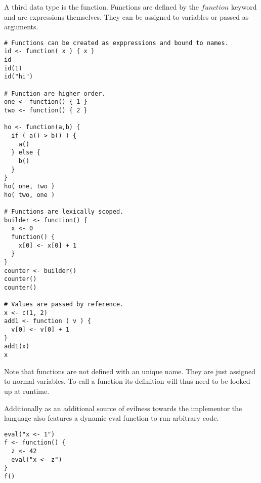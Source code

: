 A third data type is the function. Functions are defined by the $function$ keyword and are expressions themselves. They can be assigned to variables or passed as arguments.

\begin{lstlisting}[language=rift]
# Functions can be created as exppressions and bound to names.
id <- function( x ) { x }
id
id(1)
id("hi")

# Function are higher order.
one <- function() { 1 }
two <- function() { 2 }

ho <- function(a,b) {
  if ( a() > b() ) {
    a()
  } else {
    b()
  }
}
ho( one, two )
ho( two, one )

# Functions are lexically scoped.
builder <- function() {
  x <- 0
  function() {
    x[0] <- x[0] + 1
  }
}
counter <- builder()
counter()
counter()

# Values are passed by reference.
x <- c(1, 2)
add1 <- function ( v ) {
  v[0] <- v[0] + 1
}
add1(x)
x
\end{lstlisting}

Note that functions are not defined with an unique name. They are just assigned to normal variables. To call a function its definition will thus need to be looked up at runtime.

Additionally as an additional source of evilness towards the implementor the language also features a dynamic eval function to run arbitrary code.

\begin{lstlisting}[language=rift]
eval("x <- 1")
f <- function() {
  z <- 42
  eval("x <- z")
}
f()
\end{lstlisting}

